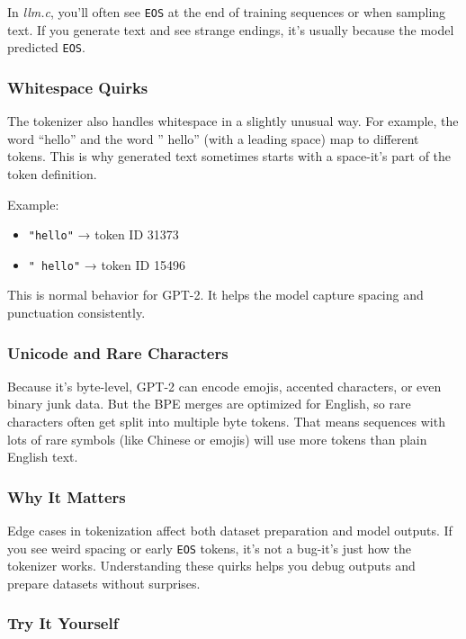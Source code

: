 \documentclass[
  letterpaper,
  DIV=11,
  numbers=noendperiod]{scrreprt}
\providecommand{\tightlist}{%
  \setlength{\itemsep}{0pt}\setlength{\parskip}{0pt}}
\begin{document}
In \emph{llm.c}, you'll often see \texttt{EOS} at the end of training
sequences or when sampling text. If you generate text and see strange
endings, it's usually because the model predicted \texttt{EOS}.

\subsubsection{Whitespace Quirks}\label{whitespace-quirks}

The tokenizer also handles whitespace in a slightly unusual way. For
example, the word ``hello'' and the word '' hello'' (with a leading
space) map to different tokens. This is why generated text sometimes
starts with a space-it's part of the token definition.

Example:

\begin{itemize}
\tightlist
\item
  \texttt{"hello"} → token ID 31373
\item
  \texttt{"\ hello"} → token ID 15496
\end{itemize}

This is normal behavior for GPT-2. It helps the model capture spacing
and punctuation consistently.

\subsubsection{Unicode and Rare
Characters}\label{unicode-and-rare-characters}

Because it's byte-level, GPT-2 can encode emojis, accented characters,
or even binary junk data. But the BPE merges are optimized for English,
so rare characters often get split into multiple byte tokens. That means
sequences with lots of rare symbols (like Chinese or emojis) will use
more tokens than plain English text.

\subsubsection{Why It Matters}\label{why-it-matters-8}

Edge cases in tokenization affect both dataset preparation and model
outputs. If you see weird spacing or early \texttt{EOS} tokens, it's not
a bug-it's just how the tokenizer works. Understanding these quirks
helps you debug outputs and prepare datasets without surprises.

\subsubsection{Try It Yourself}\label{try-it-yourself-8}
\end{document}
